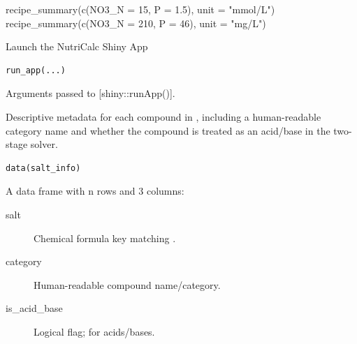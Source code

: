 \documentclass[a4paper]{book}
\begin{document}
%
\begin{Examples}
\begin{ExampleCode}
recipe_summary(c(NO3_N = 15, P = 1.5), unit = "mmol/L")
recipe_summary(c(NO3_N = 210, P = 46), unit = "mg/L")
\end{ExampleCode}
\end{Examples}
%
\begin{Description}
Launch the NutriCalc Shiny App
\end{Description}
%
\begin{Usage}
\begin{verbatim}
run_app(...)
\end{verbatim}
\end{Usage}
%
\begin{Arguments}
\begin{ldescription}
\item[\code{...}] Arguments passed to [shiny::runApp()].
\end{ldescription}
\end{Arguments}
%
\begin{Description}
Descriptive metadata for each compound in ,
including a human-readable category name and whether the compound is treated
as an acid/base in the two-stage solver.
\end{Description}
%
\begin{Usage}
\begin{verbatim}
data(salt_info)
\end{verbatim}
\end{Usage}
%
\begin{Format}
A data frame with n rows and 3 columns:
\begin{description}

\item[salt] Chemical formula key matching .
\item[category] Human-readable compound name/category.
\item[is\_acid\_base] Logical flag;  for acids/bases.

\end{description}

\end{Format}
\end{document}
